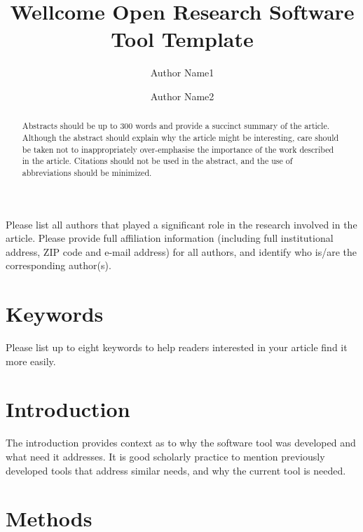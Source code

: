 \documentclass[9pt,a4paper]{extarticle}
\begin{document}
\title{Wellcome Open Research Software Tool Template}
\author[1]{Author Name1}
\author[2]{Author Name2}

\maketitle
\thispagestyle{fancy}

Please list all authors that played a significant role in the research involved in the article. Please provide full affiliation information (including full institutional address, ZIP code and e-mail address) for all authors, and identify who is/are the corresponding author(s).

\begin{abstract}

Abstracts should be up to 300 words and provide a succinct summary of the article. Although the abstract should explain why the article might be interesting, care should be taken not to inappropriately over-emphasise the importance of the work described in the article. Citations should not be used in the abstract, and the use of abbreviations should be minimized.

\end{abstract}

\section*{Keywords}

Please list up to eight keywords to help readers interested in your article find it more easily.

\clearpage

\section*{Introduction}

The introduction provides context as to why the software tool was developed and what need it addresses.  It is good scholarly practice to mention previously developed tools that address similar needs, and why the current tool is needed. 

\section*{Methods}
\end{document}
